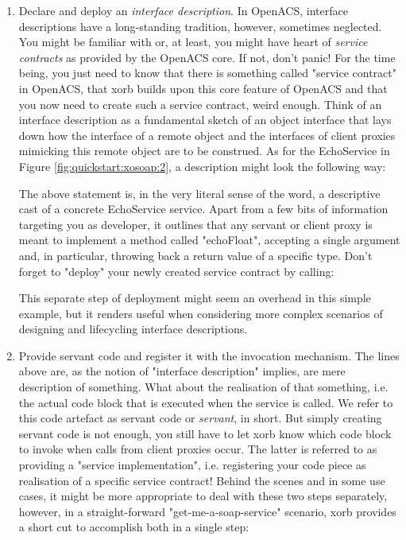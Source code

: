 \begin{enumerate}
\item Declare and deploy an \emph{interface description}. In OpenACS, interface descriptions have a long-standing tradition, however, sometimes neglected. You might be familiar with or, at least, you might have heart of \emph{service contracts} as provided by the OpenACS core. If not, don't panic! For the time being, you just need to know that there is something called "service contract" in OpenACS, that xorb builds upon this core feature of OpenACS and that you now need to create such a service contract, weird enough. Think of an interface description as a fundamental sketch of an object interface that lays down how the interface of a remote object and the interfaces of client proxies mimicking this remote object are to be construed. As for the EchoService in Figure \ref{fig:quickstart:xosoap:2}, a description might look the following way:

The above statement is, in the very literal sense of the word, a descriptive cast of a concrete EchoService service. Apart from a few bits of information targeting you as developer, it outlines that any servant or client proxy is meant to implement a method called "echoFloat", accepting a single argument and, in particular, throwing back a return value of a specific type. Don't forget to "deploy" your newly created service contract by calling:

This separate step of deployment might seem an overhead in this simple example, but it renders useful when considering more complex scenarios of designing and lifecycling interface descriptions.
\item Provide servant code and register it with the invocation mechanism. The lines above are, as the notion of "interface description" implies, are mere description of something. What about the realisation of that something, i.e. the actual code block that is executed when the service is called. We refer to this code artefact as servant code or \emph{servant}, in short. But simply creating servant code is not enough, you still have to let xorb know which code block to invoke when calls from client proxies occur. The latter is referred to as providing a "service implementation", i.e. registering your code piece as realisation of a specific service contract! Behind the scenes and in some use cases, it might be more appropriate to deal with these two steps separately, however, in a straight-forward "get-me-a-soap-service" scenario, xorb provides a short cut to accomplish both in a single step:

\end{enumerate}
